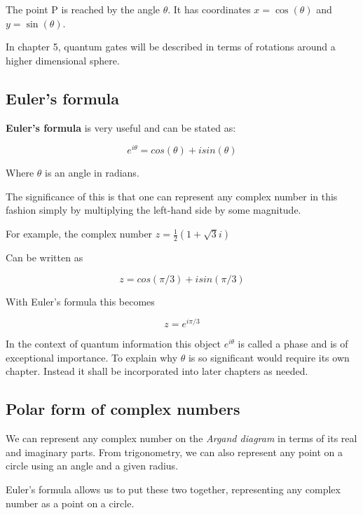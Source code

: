 \documentclass{book}
\begin{document}
The point P is reached by the angle $\theta$. It has coordinates $x = \cos(\theta)$ and $ y = \sin(\theta)$.

In chapter 5, quantum gates will be described in terms of rotations around a higher dimensional sphere. 

\subsection{ Euler's formula}

\textbf{Euler's formula} is very useful and can be stated as:

$$ e^{i \theta} = cos(\theta) + i sin(\theta) $$

Where $\theta$ is an angle in radians. 

The significance of this is that one can represent any complex number in this fashion simply by multiplying the left-hand side by some magnitude. 

For example, the complex number $ z = \frac{1}{2}( 1 + \sqrt{3}i)$ 

Can be written as 

$$ z = cos(\pi/3) + i sin(\pi/3) $$

With Euler's formula this becomes 

$$ z = e^{i \pi/3} $$

In the context of quantum information this object $ e^{i\theta}$ is called a phase and is of exceptional importance. To explain why $\theta$ is so significant would require its own chapter. Instead it shall be incorporated into later chapters as needed.


\subsection{ Polar form of complex numbers}

We can represent any complex number on the \textit{Argand diagram} in terms of its real and imaginary parts. From trigonometry, we can also represent any point on a circle using an angle and a given radius. 

Euler's formula allows us to put these two together, representing any complex number as a point on a circle. 
\end{document}
